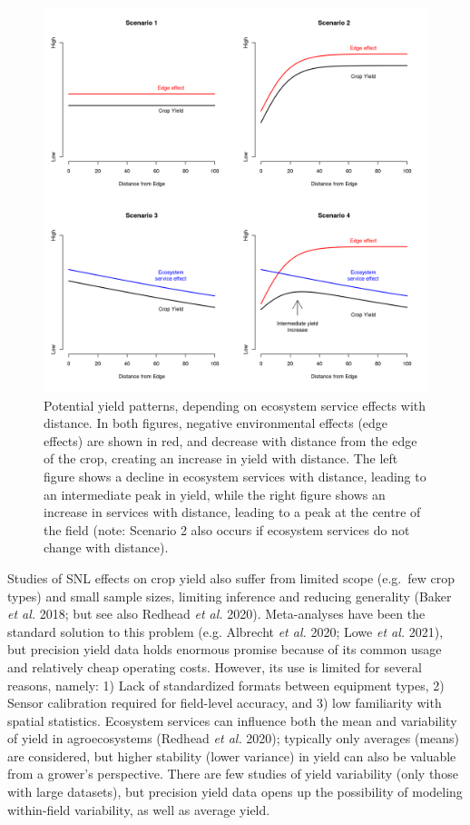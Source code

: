 \documentclass[]{elsarticle} %
\begin{document}
\begin{figure}
\includegraphics[width=1\linewidth]{../Figures/ExamplePlots/hypotheses} \caption{Potential yield patterns, depending on ecosystem service effects with distance. In both figures, negative environmental effects (edge effects) are shown in red, and decrease with distance from the edge of the crop, creating an increase in yield with distance. The left figure shows a decline in ecosystem services with distance, leading to an intermediate peak in yield, while the right figure shows an increase in services with distance, leading to a peak at the centre of the field (note: Scenario 2 also occurs if ecosystem services do not change with distance).}\label{fig:hypotheses}
\end{figure}

Studies of SNL effects on crop yield also suffer from limited scope (e.g.~few crop types) and small sample sizes, limiting inference and reducing generality (Baker \emph{et al.} 2018; but see also Redhead \emph{et al.} 2020).
Meta-analyses have been the standard solution to this problem (e.g. Albrecht \emph{et al.} 2020; Lowe \emph{et al.} 2021), but precision yield data holds enormous promise because of its common usage and relatively cheap operating costs.
However, its use is limited for several reasons, namely: 1) Lack of standardized formats between equipment types, 2) Sensor calibration required for field-level accuracy, and 3) low familiarity with spatial statistics.
Ecosystem services can influence both the mean and variability of yield in agroecosystems (Redhead \emph{et al.} 2020); typically only averages (means) are considered, but higher stability (lower variance) in yield can also be valuable from a grower's perspective.
There are few studies of yield variability (only those with large datasets), but precision yield data opens up the possibility of modeling within-field variability, as well as average yield.
\end{document}
